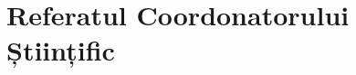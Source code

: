 \chapter*{Referatul Coordonatorului Științific}

\thispagestyle{front}
\pagestyle{front}

\newpage \
\newpage \
\newpage \
\newpage